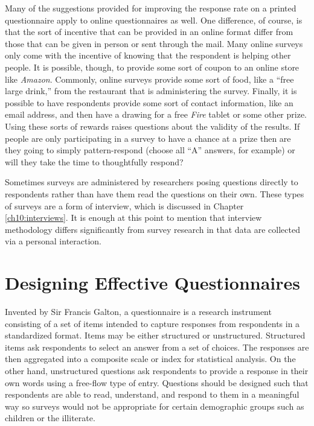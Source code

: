 Many of the suggestions provided for improving the response rate on a printed questionnaire apply to online questionnaires as well. One difference, of course, is that the sort of incentive that can be provided in an online format differ from those that can be given in person or sent through the mail. Many online surveys only come with the incentive of knowing that the respondent is helping other people. It is possible, though, to provide some sort of coupon to an online store like \textit{Amazon}. Commonly, online surveys provide some sort of food, like a ``free large drink,'' from the restaurant that is administering the survey. Finally, it is possible to have respondents provide some sort of contact information, like an email address, and then have a drawing for a free \textit{Fire} tablet or some other prize. Using these sorts of rewards raises questions about the validity of the results. If people are only participating in a survey to have a chance at a prize then are they going to simply pattern-respond (choose all ``A'' answers, for example) or will they take the time to thoughtfully respond?

Sometimes surveys are administered by researchers posing questions directly to respondents rather than have them read the questions on their own. These types of surveys are a form of interview, which is discussed in Chapter \ref{ch10:interviews}. It is enough at this point to mention that interview methodology differs significantly from survey research in that data are collected via a personal interaction. 

\section{Designing Effective Questionnaires}

Invented by Sir Francis Galton, a \gls{questionnaire} is a research instrument consisting of a set of items intended to capture responses from respondents in a standardized format. Items may be either structured or unstructured. Structured items ask respondents to select an answer from a set of choices. The responses are then aggregated into a composite scale or index for statistical analysis. On the other hand, unstructured questions ask respondents to provide a response in their own words using a free-flow type of entry. Questions should be designed such that respondents are able to read, understand, and respond to them in a meaningful way so surveys would not be appropriate for certain demographic groups such as children or the illiterate. 

